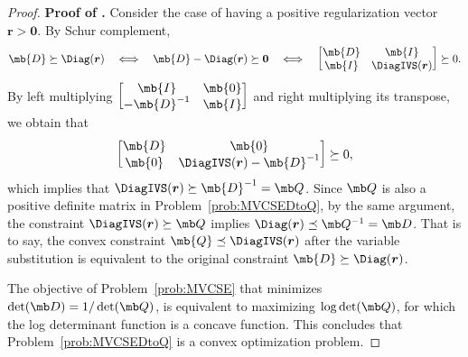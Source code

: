 \documentclass[mnsc, nonblindrev]{informswp}
\newcommand{\1}[1]{\mathds{1}{\left(#1\right)}}
\begin{document}
\begin{appendices}
\begin{proof}{\bf Proof of .}
Consider the case of having a positive regularization vector $\bm r > \bm 0$. By Schur complement,
$$
\mb{D} \succeq \Diag(\bm r)
~~~\Longleftrightarrow~~~
\mb{D} - \Diag(\bm r) \succeq \bm 0  
~~~\Longleftrightarrow~~~
\begin{bmatrix}
\mb{D} & \mb{I} \\
\mb{I} & \DiagIVS(\bm r) \\ 
\end{bmatrix} \succeq 0.
$$
By left multiplying 
$\begin{bmatrix}
\mb{I} & \mb{0} \\
- \mb{D}^{-1} & \mb{I}
\end{bmatrix}$ and right multiplying its transpose, we obtain that
$$
\begin{bmatrix}
\mb{D} & \mb{0} \\
\mb{0} & \DiagIVS(\bm r) - \mb{D}^{-1}\\ 
\end{bmatrix} \succeq 0,
$$
which implies that $\DiagIVS(\bm r) \succeq \mb{D}^{-1} = \mb Q$. Since $\mb Q$ is also a positive definite matrix in Problem~\eqref{prob:MVCSEDtoQ}, by the same argument, the constraint $\DiagIVS(\bm r) \succeq \mb Q$ implies $\Diag(\bm r) \preceq \mb Q^{-1} = \mb D$. That is to say, the convex constraint $\mb{Q} \preceq \DiagIVS(\bm r)$ after the variable substitution is equivalent to the original constraint $\mb{D} \succeq \Diag(\bm r)$.

The objective of Problem~\eqref{prob:MVCSE} that minimizes 
$\det(\mb D)=1/\det(\mb Q)$, is equivalent to maximizing $\log\det(\mb Q)$, for which the log determinant function is a concave function. This concludes that Problem~\eqref{prob:MVCSEDtoQ} is a convex optimization problem.
\hfill \Halmos
\end{proof}
\vspace{3mm}


\end{appendices}
\end{document}
